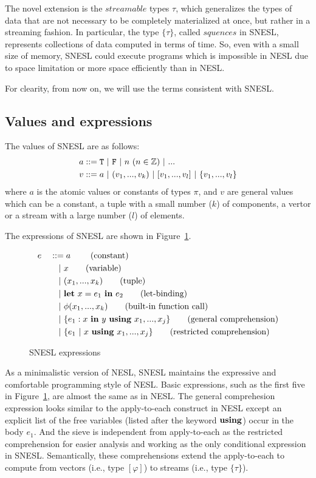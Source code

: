 The novel extension is the $streamable$ types $\tau$, which generalizes the types of data that are not necessary to be completely materialized at once, but rather in a streaming fashion. 
In particular, the type $\{\tau\}$, called $squences$ in SNESL, represents collections of data computed in terms of time.
So, even with a small size of memory, SNESL could execute programs which is impossible in NESL due to space limitation or more space efficiently than in NESL. 

For clearity, from now on, we will use the terms consistent with SNESL.

\subsection{Values and expressions}

The values of SNESL are as follows:
\begin{align*}
& a ::=  \T \ | \ \F \ | \ n \ (n \in \mathbb{Z}) \ | \ ... \\
& v ::=  a \ | \ (v_1,...,v_k) \ | \ [v_1,...,v_l] \ | \ \{v_1,...,v_l\} 
\end{align*}
where $a$ is the atomic values or constants of types $\pi$, and $v$ are
 general values which can be a constant, a tuple with a small number ($k$) of components, a vertor or a stream with a large number ($l$) of elements.  

The expressions of SNESL are shown in Figure~\ref{fig-snesl-exps}.

\begin{figure}[h]
\begin{alignat*}{2}
& e &&::=  a \     \tag{constant} \\
&   && \quad | \ x  \tag{variable} \\
&   && \quad | \ (x_1,...,x_k) \tag{tuple}\\
&   && \quad | \ \mathbf{let} \ x = e_1 \ \mathbf{in} \ e_2 \tag{let-binding}\\
&   && \quad | \ \phi{(x_1,...,x_k)}  \tag{built-in function call} \\
&   && \quad | \ \{e_1 : x \ \mathbf{in} \ y \ \mathbf{using} \ x_1,...,x_j\} \tag{general comprehension} \\
&   && \quad | \ \{ e_1 \ | \ x \ \mathbf{using} \ x_1,...,x_j \} \tag {restricted comprehension} 
\end{alignat*}
\caption{SNESL expressions \label{fig-snesl-exps}}
\end{figure}

As a minimalistic version of NESL, SNESL maintains the expressive and comfortable programming style of NESL. 
Basic expressions, such as the first five in Figure~\ref{fig-snesl-exps}, are almost the same as in NESL. 
The general comprehesion expression looks similar to the apply-to-each construct in NESL except an explicit list of the free variables (listed after the keyword $\mathbf{using}$) occur in the body $e_1$. And the sieve is independent from apply-to-each  as the restricted comprehension for easier analysis and working as the only conditional expression in SNESL. 
Semantically, these comprehensions extend the apply-to-each to compute from vectors (i.e., type $[\varphi]$) to streams (i.e., type $\{\tau\}$). 

